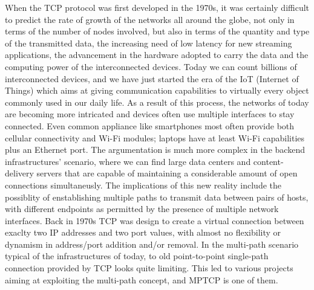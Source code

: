 When the TCP protocol was first developed in the 1970s, it was certainly difficult to predict the rate of growth of the networks all around the globe, not only in terms of the number of nodes involved, but also in terms of the quantity and type of the transmitted data, the increasing need of low latency for new streaming applications, the advancement in the hardware adopted to carry the data and the computing power of the interconnected devices. Today we can count billions of interconnected devices, and we have just started the era of the IoT (Internet of Things) which aims at giving communication capabilities to virtually every object commonly used in our daily life.
As a result of this process, the networks of today are becoming more intricated and devices often use multiple interfaces to stay connected. Even common appliance like smartphones most often provide both cellular connectivity and Wi-Fi modules; laptops have at least Wi-Fi capabilities plus an Ethernet port. The argumentation is much more complex in the backend infrastructures' scenario, where we can find large data centers and content-delivery servers that are capable of maintaining a considerable amount of open connections simultaneusly.
The implications of this new reality include the possiblity of enstablishing multiple paths to transmit data between pairs of hosts, with different endpoints as permitted by the presence of multiple network interfaces. Back in 1970s TCP was design to create a virtual connection between exaclty two IP addresses and two port values, with almost no flexibility or dynamism in address/port addition and/or removal. In the multi-path scenario typical of the infrastructures of today, to old point-to-point single-path connection provided by TCP looks quite limiting. This led to various projects aiming at exploiting the multi-path concept, and MPTCP is one of them.

